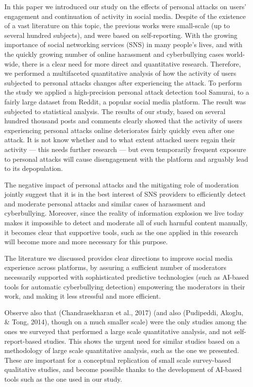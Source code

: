 \documentclass[
  10pt,
  dvipsnames]{scrartcl}
\begin{document}
In this paper we introduced our study on the effects of personal attacks
on users' engagement and continuation of activity in social media.
Despite of the existence of a vast literature on this topic, the
previous works were small-scale (up to several hundred subjects), and
were based on self-reporting. With the growing importance of social
networking services (SNS) in many people's lives, and with the quickly
growing number of online harassment and cyberbullying cases world-wide,
there is a clear need for more direct and quantitative research.
Therefore, we performed a multifaceted quantitative analysis of how the
activity of users subjected to personal attacks changes after
experiencing the attack. To perform the study we applied a
high-precision personal attack detection tool \textsf{Samurai,} to a
fairly large dataset from Reddit, a popular social media platform. The
result was subjected to statistical analysis. The results of our study,
based on several hundred thousand posts and comments clearly showed that
the activity of users experiencing personal attacks online deteriorates
fairly quickly even after one attack. It is not know whether and to what
extent attacked users regain their activity --- this needs further
research --- but even temporarily frequent exposure to personal attacks
will cause disengagement with the platform and arguably lead to its
depopulation.

The negative impact of personal attacks and the mitigating role of
moderation jointly suggest that it is in the best interest of SNS
providers to efficiently detect and moderate personal attacks and
similar cases of harassment and cyberbullying. Moreover, since the
reality of information explosion we live today makes it impossible to
detect and moderate all of such harmful content manually, it becomes
clear that supportive tools, such as the one applied in this research
will become more and more necessary for this purpose.

The literature we discussed provides clear directions to improve social
media experience across platforms, by assuring a sufficient number of
moderators necessarily supported with sophisticated predictive
technologies (such as AI-based tools for automatic cyberbullying
detection) empowering the moderators in their work, and making it less
stressful and more efficient.

Observe also that (Chandrasekharan et al., 2017) (and also (Pudipeddi,
Akoglu, \& Tong, 2014), though on a much smaller scale) were the only
studies among the ones we surveyed that performed a large scale
quantitative analysis, and not self-report-based studies. This shows the
urgent need for similar studies based on a methodology of large scale
quantitative analysis, such as the one we presented. These are important
for a conceptual replication of small scale survey-based qualitative
studies, and become possible thanks to the development of AI-based tools
such as the one used in our study.
\end{document}
